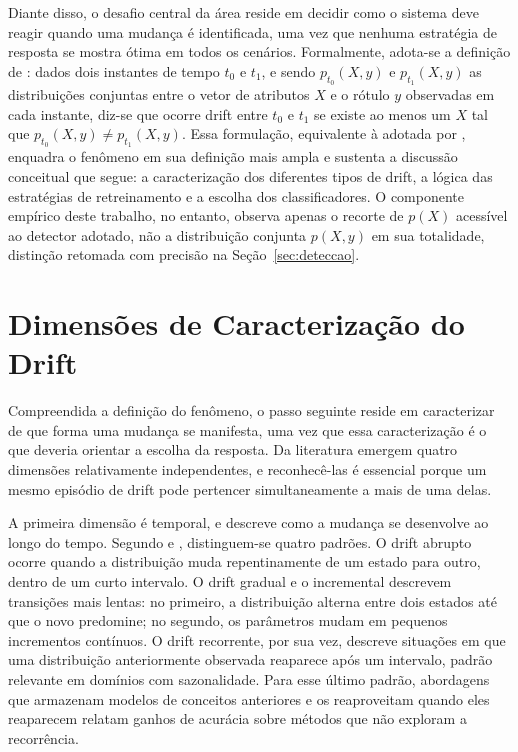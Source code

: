 Diante disso, o desafio central da área reside em decidir como o sistema deve
reagir quando uma mudança é identificada, uma vez que nenhuma estratégia de
resposta se mostra ótima em todos os cenários. Formalmente, adota-se a
definição de : dados dois instantes de tempo $t_0$ e
$t_1$, e sendo $p_{t_0}(X, y)$ e $p_{t_1}(X, y)$ as distribuições conjuntas
entre o vetor de atributos $X$ e o rótulo $y$ observadas em cada instante,
diz-se que ocorre drift entre $t_0$ e $t_1$ se existe ao menos um $X$ tal que
$p_{t_0}(X, y) \neq p_{t_1}(X, y)$. Essa formulação, equivalente à adotada
por , enquadra o fenômeno em sua definição mais ampla e
sustenta a discussão conceitual que segue: a caracterização dos diferentes
tipos de drift, a lógica das estratégias de retreinamento e a escolha dos
classificadores. O componente empírico deste trabalho, no entanto, observa
apenas o recorte de $p(X)$ acessível ao detector adotado, não a distribuição
conjunta $p(X,y)$ em sua totalidade, distinção retomada com precisão na
Seção~\ref{sec:deteccao}.

\section{Dimensões de Caracterização do Drift}
\label{sec:dimensoes}
Compreendida a definição do fenômeno, o passo seguinte reside em caracterizar
de que forma uma mudança se manifesta, uma vez que essa caracterização é o
que deveria orientar a escolha da resposta. Da literatura emergem quatro
dimensões relativamente independentes, e reconhecê-las é essencial porque um
mesmo episódio de drift pode pertencer simultaneamente a mais de uma delas.

A primeira dimensão é temporal, e descreve como a mudança se desenvolve ao
longo do tempo. Segundo  e ,
distinguem-se quatro padrões. O drift abrupto ocorre quando a distribuição
muda repentinamente de um estado para outro, dentro de um curto intervalo. O
drift gradual e o incremental descrevem transições mais lentas: no primeiro,
a distribuição alterna entre dois estados até que o novo predomine; no
segundo, os parâmetros mudam em pequenos incrementos contínuos. O drift
recorrente, por sua vez, descreve situações em que uma distribuição
anteriormente observada reaparece após um intervalo, padrão relevante em
domínios com sazonalidade. Para esse último padrão, abordagens que armazenam modelos de
conceitos anteriores e os reaproveitam quando eles reaparecem
\cite{sun2018,li2021} relatam ganhos de acurácia sobre métodos que não
exploram a recorrência.

